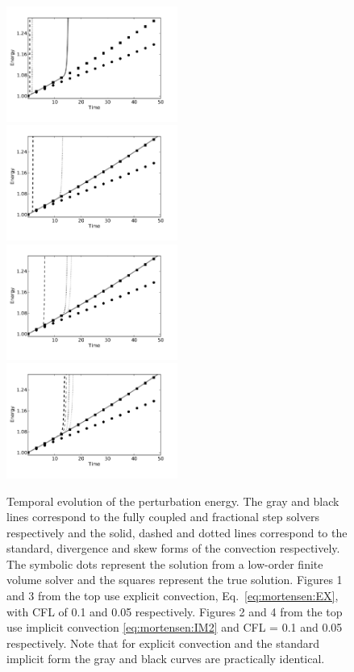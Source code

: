 \begin{figure}
\includegraphics[width=0.5\textwidth]{chapters/mortensen/pdf/OS_energy_cfl_0_1_model_1.pdf}
\includegraphics[width=0.5\textwidth]{chapters/mortensen/pdf/OS_energy_cfl_0_1_model_0.pdf}
\includegraphics[width=0.5\textwidth]{chapters/mortensen/pdf/OS_energy_cfl_0_05_model_1.pdf}
\includegraphics[width=0.5\textwidth]{chapters/mortensen/pdf/OS_energy_cfl_0_05_model_0.pdf}
 \caption{Temporal evolution of the perturbation energy. The gray and
   black lines correspond to the fully coupled and fractional step
   solvers respectively and the solid, dashed and dotted lines
   correspond to the standard, divergence and skew forms of the
   convection respectively. The symbolic dots represent the solution
   from a low-order finite volume solver and the squares represent the
   true solution. Figures 1 and 3 from the top use explicit convection,
   Eq.~\eqref{eq:mortensen:EX}, with CFL of 0.1 and 0.05 respectively.
   Figures 2 and 4 from the top use implicit convection \eqref{eq:mortensen:IM2} and CFL =
   0.1 and 0.05 respectively. Note that for explicit convection and the standard
   implicit form the gray and black curves are practically
   identical. }
\label{fig:mortensen:OS_long_time}
\end{figure}


